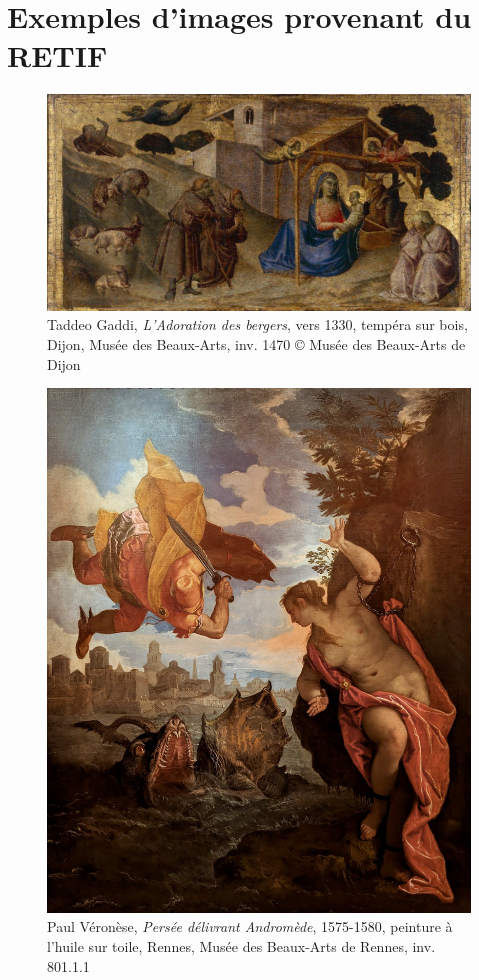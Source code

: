\section{Exemples d'images provenant du RETIF}

\begin{figure}[H]
    \centering
    \includegraphics[width=1\textwidth]{annexes/figures/ptrGaddiAdoration.jpg}
    \caption{Taddeo Gaddi, \textit{L'Adoration des bergers}, vers 1330, tempéra sur bois, Dijon, Musée des Beaux-Arts, inv. 1470 © Musée des Beaux-Arts de Dijon}
    \label{fig:ptrGaddiAdoration}
\end{figure}


\begin{figure}[H]
    \centering
    \includegraphics[height=0.4\textheight]{annexes/figures/ptrVeronesePersee.jpg}
    \caption{Paul Véronèse, \textit{Persée délivrant Andromède}, 1575-1580, peinture à l'huile sur toile, Rennes, Musée des Beaux-Arts de Rennes, inv. 801.1.1}
    \label{fig:ptrVeronesePersee}
\end{figure}

